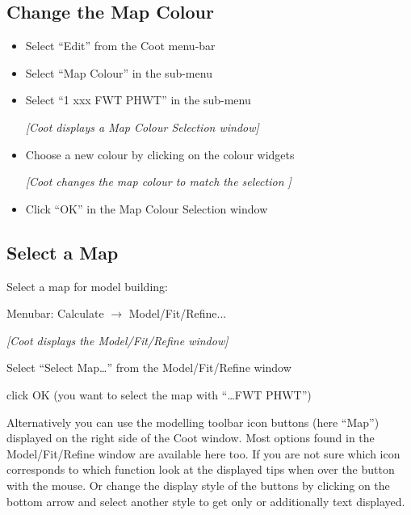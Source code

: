 \documentclass{article}
\begin{document}
\subsection{Change the Map Colour}
\begin{itemize}
\item Select \textsf{``Edit''} from the Coot menu-bar
\item Select \textsf{``Map Colour''} in the sub-menu
\item Select \textsf{``1 xxx FWT PHWT''} in the sub-menu

\textsl{ [Coot displays a Map Colour Selection window]}

\item Choose a new colour by clicking on the colour widgets

\textsl{ [Coot changes the map colour to match the selection ]}

\item Click \textsf{``OK''} in the Map Colour Selection window

\end{itemize}

\subsection{Select a Map}
Select a map for model building:

\begin{trivlist}

\item Menubar: \textsf{Calculate $\rightarrow$ Model/Fit/Refine...}

\textsl{ [Coot displays the Model/Fit/Refine window]}

\item Select \textsf{``Select Map\ldots''} from the Model/Fit/Refine
  window

\item click OK (you want to select the map with ``\ldots FWT PHWT'')

Alternatively you can use the modelling toolbar icon buttons (here
``Map'') displayed on the right side of the Coot window. Most
options found in the Model/Fit/Refine window are available here too.
If you are not sure which icon corresponds to which function look at
the displayed tips when over the button with the mouse. Or change
the display style of the buttons by clicking on the bottom arrow and
select another style to get only or additionally text displayed.
  
\end{trivlist}
\end{document}
